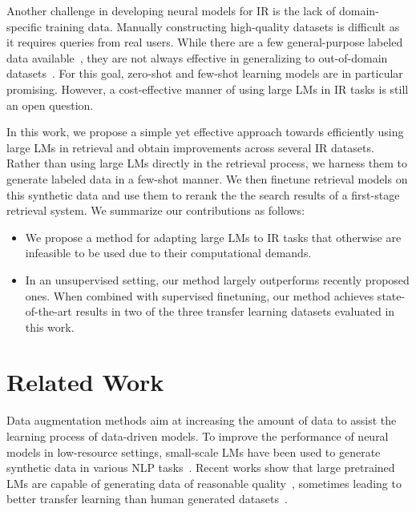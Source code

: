 \documentclass[11pt]{article}
\begin{document}
Another challenge in developing neural models for IR is the lack of domain-specific training data. Manually constructing high-quality datasets is difficult as it requires queries from real users. %
While there are a few general-purpose labeled data available~\cite{DBLP:journals/corr/NguyenRSGTMD16,47761}, they are not always effective in generalizing to out-of-domain datasets~\cite{thakur2021beir}.
For this goal, zero-shot and few-shot learning models are in particular promising.
However, a cost-effective manner of using large LMs in IR tasks is still an open question.

In this work, we propose a simple yet effective approach towards efficiently using large LMs in retrieval and obtain improvements across several IR datasets.
Rather than using large LMs directly in the retrieval process, we harness them to generate labeled data in a few-shot manner.
We then finetune retrieval models on this synthetic data and use them to rerank the the search results of a first-stage retrieval system. 
We summarize our contributions as follows:
\begin{itemize}
    \item We propose a method for adapting large LMs to IR tasks that otherwise are infeasible to be used due to their computational demands.
    \item In an unsupervised setting, our method largely outperforms recently proposed ones. When combined with supervised finetuning, our method achieves state-of-the-art results in two of the three transfer learning datasets evaluated in this work.
\end{itemize}


\section{Related Work}

Data augmentation methods aim at increasing the amount of data to assist the learning process of data-driven models.
To improve the performance of neural models in low-resource settings, small-scale LMs have been used to generate synthetic data in various NLP tasks~\cite{fadaee-etal-2017-data,kobayashi2018contextual}. 
Recent works show that large pretrained LMs are capable of generating data of reasonable quality~\cite{anaby2020not,papanikolaou2020dare,yang2020g,mohapatra2021simulated,kumar2020data,schick2021generating,meng2022generating}, sometimes leading to better transfer learning than human generated datasets~\cite{liu2022wanli}.
\end{document}
